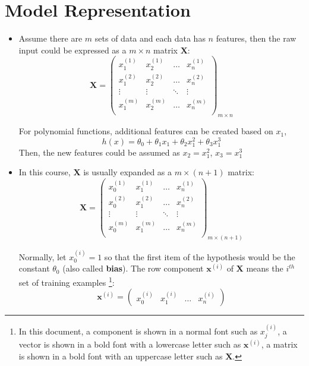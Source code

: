 \section{Model Representation}
\begin{itemize} 
    \item Assume there are $m$ sets of data and each data has $n$ features, then the raw input could be expressed as a $m \times n$ matrix $\mathbf{X}$:
    \begin{equation}
        \mathbf{X} =
        \left(
        \begin{matrix}
            x_1^{(1)} & x_2^{(1)} & \dots  & x_n^{(1)}\\
            x_1^{(2)} & x_2^{(2)} & \dots  & x_n^{(2)}\\
            \vdots    & \vdots    & \ddots & \vdots   \\
            x_1^{(m)} & x_2^{(m)} & \dots  & x_n^{(m)}\\
        \end{matrix}
        \right)_{m \times n}
    \end{equation}
    
    For polynomial functions, additional features can be created based on $x_1$,
    \begin{equation}
        h\left(x\right) = \theta_0 + \theta_1 x_1 + \theta_2 x_1^2 + \theta_3 x_1^3
    \end{equation}
    Then, the new features could be assumed as $x_2 = x_1^2$, $x_3 = x_1^3$
    
    \item In this course, $\mathbf{X}$ is usually expanded as a $m \times (n+1)$ matrix:
    \begin{equation}
        \mathbf{X} = 
        \left(
        \begin{matrix}
            x_0^{(1)} & x_1^{(1)} & \dots  & x_n^{(1)}\\
            x_0^{(2)} & x_1^{(2)} & \dots  & x_n^{(2)}\\
            \vdots    & \vdots    & \ddots & \vdots   \\
            x_0^{(m)} & x_1^{(m)} & \dots  & x_n^{(m)}\\
        \end{matrix}
        \right)_{m \times (n+1)}
    \end{equation}

    Normally, let $x_0^{(i)} = 1$ so that the first item of the hypothesis would be the constant $\theta_0$ (also called \textbf{bias}). The row component $\mathbf{x}^{(i)}$ of $\mathbf{X}$ means the $i^{th}$ set of training examples
    \footnote{In this document, a component is shown in a normal font such as $x^{(i)}_j$, a vector is shown in a bold font with a lowercase letter such as $\mathbf{x}^{(i)}$, a matrix is shown in a bold font with an uppercase letter such as $\mathbf{X}$.}:
    \begin{equation}
        \mathbf{x}^{(i)} = \left(\begin{matrix} x_0^{(i)} & x_1^{(i)} & \dots & x_n^{(i)} \end{matrix}\right)
    \end{equation}
    

\end{itemize}

